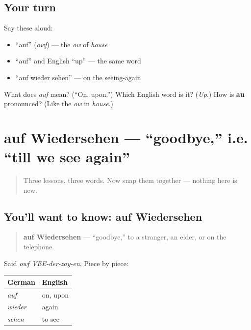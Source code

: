 \subsection*{Your turn}
Say these aloud:

\begin{itemize}
\raggedright
  \item \textquotedblleft{}auf\textquotedblright{} (\emph{owf}) — the \emph{ow} of \emph{house}
  \item \textquotedblleft{}auf\textquotedblright{} and English \textquotedblleft{}up\textquotedblright{} — the same word
  \item \textquotedblleft{}auf wieder sehen\textquotedblright{} — on the seeing-again
\end{itemize}

\begin{tcolorbox}[breakable,colback=teal!4,colframe=teal!35!black,title={Before you move on}]
What does \emph{auf} mean? (\textquotedblleft{}On, upon.\textquotedblright{}) Which English word is it? (\emph{Up}.) How is \textbf{au} pronounced? (Like the \emph{ow} in \emph{house}.)
\end{tcolorbox}
\section[auf Wiedersehen]{auf Wiedersehen — \textquotedblleft{}goodbye,\textquotedblright{} i.e. \textquotedblleft{}till we see again\textquotedblright{}}

\label{lesson:GE-C04-auf-wiedersehen}



\begin{quote}
Three lessons, three words. Now snap them together — nothing here is new.
\end{quote}

\subsection*{You'll want to know: auf Wiedersehen}
\begin{quote}
\textbf{auf Wiedersehen} — \textquotedblleft{}goodbye,\textquotedblright{} to a stranger, an elder, or on the telephone.
\end{quote}

Said \emph{owf VEE-der-zay-en}. Piece by piece:

\noindent
\begin{tabularx}{\linewidth}{@{}>{\raggedright\arraybackslash}X>{\raggedright\arraybackslash}X@{}}
\toprule
\textbf{German} & \textbf{English} \\
\midrule
\emph{auf} & on, upon \\
\emph{wieder} & again \\
\emph{sehen} & to see \\
\bottomrule
\end{tabularx}

